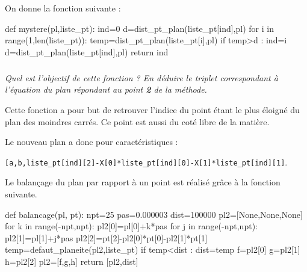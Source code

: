 \newpage 

On donne la fonction suivante :

\begin{py}
\begin{python}
def mystere(pl,liste_pt):
    ind=0
    d=dist_pt_plan(liste_pt[ind],pl)
    for i in range(1,len(liste_pt)):
        temp=dist_pt_plan(liste_pt[i],pl)
        if temp>d :
            ind=i
            d=dist_pt_plan(liste_pt[ind],pl)
    return ind
\end{python}
\end{py}

\fi 

\subparagraph{}
\textit{Quel est l'objectif de cette fonction ? En déduire le triplet correspondant à l'équation du plan répondant au point \textbf{2} de la méthode. }
\ifprof
\begin{corrige}
Cette fonction a pour but de retrouver l'indice du point étant le plus éloigné du plan des moindres carrés. Ce point est aussi du coté libre de la matière.

Le nouveau plan a donc pour caractéristiques : 

\texttt{[a,b,liste\_pt[ind][2]-X[0]*liste\_pt[ind][0]-X[1]*liste\_pt[ind][1]}.
\end{corrige}
\else
\fi

\ifprof
\else
Le balançage du plan par rapport à un point est réalisé grâce à la fonction suivante. 

\begin{py}
\begin{python}
def balancage(pl, pt):
    npt=25
    pas=0.000003
    dist=100000
    pl2=[None,None,None]
    for k in range(-npt,npt):
        pl2[0]=pl[0]+k*pas
        for j in range(-npt,npt):
            pl2[1]=pl[1]+j*pas
            pl2[2]=pt[2]-pl2[0]*pt[0]-pl2[1]*pt[1]
            temp=defaut_planeite(pl2,liste_pt)	
            if temp<dist :
                dist=temp
                f=pl2[0]
                g=pl2[1]
                h=pl2[2]
    pl2=[f,g,h]    
    return [pl2,dist]	
\end{python}
\end{py}

\fi

